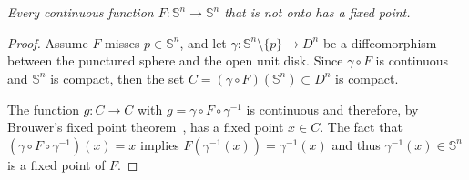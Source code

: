 \documentclass[11pt]{article}
\begin{document}
\emph{
	Every continuous function $F:\mathbb{S}^n\rightarrow\mathbb{S}^n$ that is not onto has a fixed point. 
}
\begin{proof}
	Assume $F$ misses $p\in\mathbb{S}^n$, and let
$\gamma:\mathbb{S}^n\setminus\{p\}\rightarrow D^n$ be a diffeomorphism
between the punctured sphere and the open unit disk. 
Since $\gamma\circ F$ is continuous and $\mathbb{S}^n$ is compact,
then the set $C = (\gamma\circ F) (\mathbb{S}^n)\subset D^n$ is compact.

The function $g:C\rightarrow C$ with $g = \gamma \circ F\circ\gamma^{-1}$ 
is continuous and therefore, by Brouwer's fixed point theorem~\cite{Milnor}, has a fixed point $x\in C$. 
The fact that $(\gamma \circ F\circ \gamma^{-1}) (x) = x$ implies $F(\gamma^{-1}(x)) = \gamma^{-1}(x)$ 
and thus $\gamma^{-1}(x)\in\mathbb{S}^n$ is a fixed point of $F$. 
\end{proof}
\end{document}
